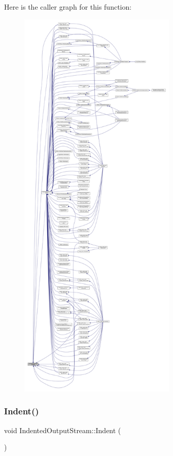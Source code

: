 Here is the caller graph for this function\+:
\nopagebreak
\begin{figure}[H]
\begin{center}
\leavevmode
\includegraphics[height=550pt]{d4/d62/classIndentedOutputStream_a0f85e6d203422d7f1c690a3e8a1366fa_icgraph}
\end{center}
\end{figure}
\mbox{\label{classIndentedOutputStream_a875a467bf36c8409e362b1c345e66f6a}} 
\subsubsection{\texorpdfstring{Indent()}{Indent()}}
{\footnotesize\ttfamily void Indented\+Output\+Stream\+::\+Indent (\begin{DoxyParamCaption}{ }\end{DoxyParamCaption})}



